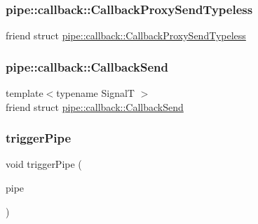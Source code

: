 \subsubsection{\texorpdfstring{pipe\+::callback\+::\+Callback\+Proxy\+Send\+Typeless}{pipe::callback::CallbackProxySendTypeless}}
{\footnotesize\ttfamily friend struct \hyperlink{structvt_1_1pipe_1_1callback_1_1_callback_proxy_send_typeless}{pipe\+::callback\+::\+Callback\+Proxy\+Send\+Typeless}\hspace{0.3cm}{\ttfamily [friend]}}

\mbox{\label{structvt_1_1pipe_1_1_pipe_manager_base_a2b276fd292a6811275e653a7428a694e}} 
\subsubsection{\texorpdfstring{pipe\+::callback\+::\+Callback\+Send}{pipe::callback::CallbackSend}}
{\footnotesize\ttfamily template$<$typename SignalT $>$ \\
friend struct \hyperlink{structvt_1_1pipe_1_1callback_1_1_callback_send}{pipe\+::callback\+::\+Callback\+Send}\hspace{0.3cm}{\ttfamily [friend]}}

\mbox{\label{structvt_1_1pipe_1_1_pipe_manager_base_a43a19aaa47959ca575b8c99a31433f0e}} 
\subsubsection{\texorpdfstring{trigger\+Pipe}{triggerPipe}}
{\footnotesize\ttfamily void trigger\+Pipe (\begin{DoxyParamCaption}\item[{\hyperlink{namespacevt_ac9852acda74d1896f48f406cd72c7bd3}{Pipe\+Type} const \&}]{pipe }\end{DoxyParamCaption})\hspace{0.3cm}{\ttfamily [friend]}}

